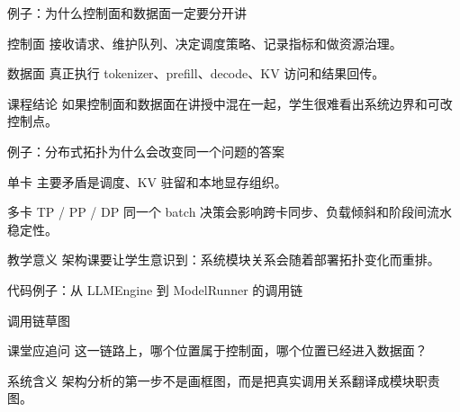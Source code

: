 \begin{frame}{例子：为什么控制面和数据面一定要分开讲}
  \begin{block}{控制面}
    接收请求、维护队列、决定调度策略、记录指标和做资源治理。
  \end{block}
  \pause
  \begin{block}{数据面}
    真正执行 tokenizer、prefill、decode、KV 访问和结果回传。
  \end{block}
  \pause
  \begin{block}{课程结论}
    如果控制面和数据面在讲授中混在一起，学生很难看出系统边界和可改控制点。
  \end{block}
\end{frame}

\begin{frame}{例子：分布式拓扑为什么会改变同一个问题的答案}
  \begin{block}{单卡}
    主要矛盾是调度、KV 驻留和本地显存组织。
  \end{block}
  \pause
  \begin{block}{多卡 TP / PP / DP}
    同一个 batch 决策会影响跨卡同步、负载倾斜和阶段间流水稳定性。
  \end{block}
  \pause
  \begin{block}{教学意义}
    架构课要让学生意识到：系统模块关系会随着部署拓扑变化而重排。
  \end{block}
\end{frame}

\begin{frame}{代码例子：从 LLMEngine 到 ModelRunner 的调用链}
  \begin{block}{调用链草图}
    {\ttfamily\small
    \par
    \par
    \par
    }
  \end{block}
  \pause
  \begin{block}{课堂应追问}
    这一链路上，哪个位置属于控制面，哪个位置已经进入数据面？
  \end{block}
  \pause
  \begin{block}{系统含义}
    架构分析的第一步不是画框图，而是把真实调用关系翻译成模块职责图。
  \end{block}
\end{frame}

